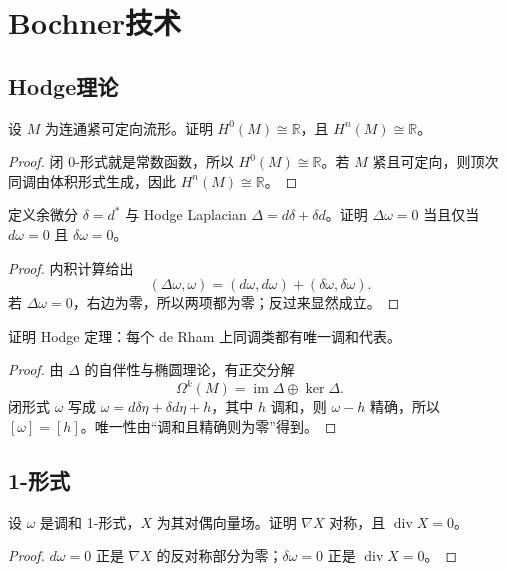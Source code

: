 \documentclass[11pt,a4paper,openany]{ctexbook}
\numberwithin{equation}{chapter}
\begin{document}
\chapter{Bochner技术}

\section{Hodge理论}

\begin{problem}
设 \(M\) 为连通紧可定向流形。证明 \(H^0(M)\cong \mathbb R\)，且 \(H^n(M)\cong \mathbb R\)。
\end{problem}
\begin{proof}
闭 0-形式就是常数函数，所以 \(H^0(M)\cong \mathbb R\)。若 \(M\) 紧且可定向，则顶次同调由体积形式生成，因此 \(H^n(M)\cong \mathbb R\)。
\end{proof}

\begin{problem}
定义余微分 \(\delta=d^*\) 与 Hodge Laplacian \(\Delta=d\delta+\delta d\)。证明 \(\Delta\omega=0\) 当且仅当 \(d\omega=0\) 且 \(\delta\omega=0\)。
\end{problem}
\begin{proof}
内积计算给出
\[
(\Delta\omega,\omega)=(d\omega,d\omega)+(\delta\omega,\delta\omega).
\]
若 \(\Delta\omega=0\)，右边为零，所以两项都为零；反过来显然成立。
\end{proof}

\begin{problem}
证明 Hodge 定理：每个 de Rham 上同调类都有唯一调和代表。
\end{problem}
\begin{proof}
由 \(\Delta\) 的自伴性与椭圆理论，有正交分解
\[
\Omega^k(M)=\operatorname{im}\Delta\oplus\ker\Delta.
\]
闭形式 \(\omega\) 写成 \(\omega=d\delta\eta+\delta d\eta+h\)，其中 \(h\) 调和，则 \(\omega-h\) 精确，所以 \([\omega]=[h]\)。唯一性由“调和且精确则为零”得到。
\end{proof}

\section{1-形式}

\begin{problem}
设 \(\omega\) 是调和 1-形式，\(X\) 为其对偶向量场。证明 \(\nabla X\) 对称，且 \(\operatorname{div}X=0\)。
\end{problem}
\begin{proof}
\(d\omega=0\) 正是 \(\nabla X\) 的反对称部分为零；\(\delta\omega=0\) 正是 \(\operatorname{div}X=0\)。
\end{proof}
\end{document}
